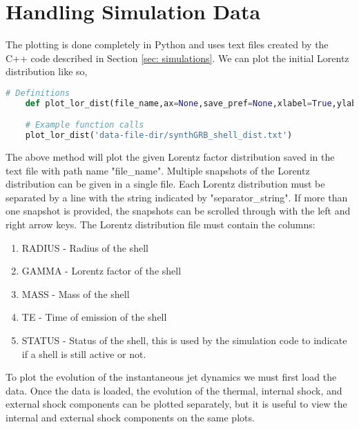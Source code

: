 \documentclass[linenumbers]{aastex631}
\begin{document}
\section{Handling Simulation Data} \label{sec: plotting}

The plotting is done completely in Python and uses text files created by the C++ code described in Section \ref{sec: simulations}. We can plot the initial Lorentz distribution like so, 

\begin{lstlisting}[language = Python, caption = Plotting Lorentz Distributions, label={lst: plot lor dist }]
    # Definitions
    def plot_lor_dist(file_name,ax=None,save_pref=None,xlabel=True,ylabel=True,label=None,fontsize=14,fontweight='bold',linestyle='solid', separator_string = "// Next step\n")

    # Example function calls
    plot_lor_dist('data-file-dir/synthGRB_shell_dist.txt')
\end{lstlisting}

The above method will plot the given Lorentz factor distribution saved in the text file with path name "file_name". Multiple snapshots of the Lorentz distribution can be given in a single file. Each Lorentz distribution must be separated by a line with the string indicated by "separator_string". If more than one snapshot is provided, the snapshots can be scrolled through with the left and right arrow keys. The Lorentz distribution file must contain the columns: 
\begin{enumerate}
    \item RADIUS - Radius of the shell
    \item GAMMA - Lorentz factor of the shell
    \item MASS - Mass of the shell
    \item TE - Time of emission of the shell
    \item STATUS - Status of the shell, this is used by the simulation code to indicate if a shell is still active or not.
\end{enumerate}

To plot the evolution of the instantaneous jet dynamics we must first load the data. Once the data is loaded, the evolution of the thermal, internal shock, and external shock components can be plotted separately, but it is useful to view the internal and external shock components on the same plots.
\end{document}
